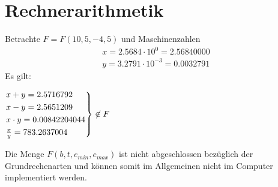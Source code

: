 \section{Rechnerarithmetik}
\begin{example}
Betrachte $F=F(10,5,-4,5)$ und Maschinenzahlen
\begin{align*}
x=2.5684 \cdot 10^{0}= 2.56840000 \\
y=3.2791 \cdot 10^{-3} = 0.0032791
\end{align*}
Es gilt:\\
\begin{center}
$\begin{rcases}
	x+y= 2.5716792 \\
	x-y= 2.5651209 \\
	x \cdot y= 0.00842204044 \\
	\frac{x}{y}= 783.2637004
\end{rcases} \not\in F$
\end{center}
\end{example}
\begin{remark}
Die Menge $F(b,t,e_{min},e_{max})$ ist nicht abgeschlossen bezüglich der Grundrechenarten und können somit im Allgemeinen nicht im Computer implementiert werden.
\end{remark}

